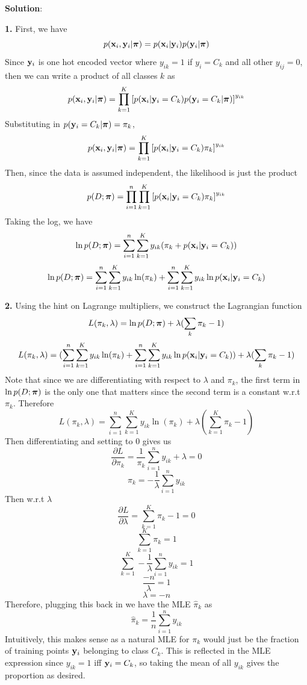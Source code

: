 \documentclass[submit]{../harvardml}
\newenvironment{solution}{
    \vspace{2mm}
    \color{black}\noindent\textbf{Solution}:
}{}
\begin{document}
\begin{solution}
    \begin{tcolorbox}
        \textbf{1.} First, we have
        $$p(\mathbf{x}_i, \mathbf{y}_i | \boldsymbol{\pi}) = p(\mathbf{x}_i|\mathbf{y}_i) p(\mathbf{y}_i | \boldsymbol{\pi})$$
        Since $\mathbf{y}_i $ is one hot encoded vector where $y_{ik} = 1$ if $y_i = C_k$ and all other $y_{ij} = 0$, then we can write a product of all classes $k$ as
        $$p(\mathbf{x}_i, \mathbf{y}_i | \boldsymbol{\pi}) = \prod_{k=1}^K  \left[p(\mathbf{x}_i|\mathbf{y}_i = C_k) p(\mathbf{y}_i = C_k | \boldsymbol{\pi})\right] ^{y_{ik}}$$
        Substituting in $p(\mathbf{y}_i = C_k | \boldsymbol{\pi}) = \pi_k$,
        $$p(\mathbf{x}_i, \mathbf{y}_i | \boldsymbol{\pi}) = \prod_{k=1}^K  \left[p(\mathbf{x}_i|\mathbf{y}_i = C_k) \pi_k\right] ^{y_{ik}}$$
        Then, since the data is assumed independent, the likelihood is just the product
        $$p(D; \boldsymbol{\pi}) = \prod_{i=1}^n \prod_{k=1}^K  \left[p(\mathbf{x}_i|\mathbf{y}_i = C_k)\pi_k\right] ^{y_{ik}}$$
        Taking the log, we have
        $$\ln p(D; \boldsymbol{\pi}) = \sum_{i=1}^n \sum_{k=1}^K  y_{ik}(\pi_k + p(\mathbf{x}_i|\mathbf{y}_i = C_k))$$
        $$\ln p(D; \boldsymbol{\pi}) = \sum_{i=1}^n \sum_{k=1}^K  y_{ik}\ln(\pi_k) + \sum_{i=1}^n \sum_{k=1}^K  y_{ik}\ln p(\mathbf{x}_i|\mathbf{y}_i = C_k)$$
    \end{tcolorbox}
    \begin{tcolorbox}
        \textbf{2.} Using the hint on Lagrange multipliers, we construct the Lagrangian function
        $$L(\pi_k, \lambda) = \ln p(D; \boldsymbol{\pi}) + \lambda (\sum_k\pi_k - 1)$$
        $$L(\pi_k, \lambda) = (\sum_{i=1}^n \sum_{k=1}^K  y_{ik}\ln(\pi_k) + \sum_{i=1}^n \sum_{k=1}^K  y_{ik}\ln p(\mathbf{x}_i|\mathbf{y}_i = C_k)) + \lambda (\sum_k\pi_k - 1)$$
        Note that since we are differentiating with respect to $\lambda$ and $\pi_k$, the first term in $\ln p(D; \boldsymbol{\pi})$ is the only one that matters since the second term is a constant w.r.t $\pi_k$. Therefore
        $$L(\pi_k, \lambda) = \sum_{i=1}^n \sum_{k=1}^K  y_{ik}\ln(\pi_k) + \lambda (\sum_{k=1}^K\pi_k - 1)$$
        Then differentiating and setting to 0 gives us
        $$\frac{\partial L}{\partial \pi_k} = \frac{1}{\pi_k}\sum_{i=1}^n y_{ik} + \lambda = 0$$
        $$\pi_k = -\frac{1}{\lambda}\sum_{i=1}^n y_{ik}$$
        Then w.r.t $\lambda$
        $$\frac{\partial L}{\partial \lambda} =  \sum_{k=1}^K\pi_k - 1 = 0$$
        $$\sum_{k=1}^K\pi_k  = 1$$
        $$\sum_{k=1}^K-\frac{1}{\lambda}\sum_{i=1}^n y_{ik}  = 1$$
        $$\frac{-n}{\lambda} = 1$$
        $$\lambda = -n$$
        Therefore, plugging this back in we have the MLE $\hat\pi_k$ as
        $$\hat\pi_k = \frac{1}{n}\sum_{i=1}^n y_{ik}$$
        Intuitively, this makes sense as a natural MLE for $\pi_k$ would just be the fraction of training points $\mathbf{y}_i$ belonging to class $C_k$. This is reflected in the MLE expression since $y_{ik} = 1$ iff $\mathbf{y}_i = C_k$, so taking the mean of all $y_{ik}$ gives the proportion as desired.

\end{tcolorbox}
\end{solution}
\end{document}
